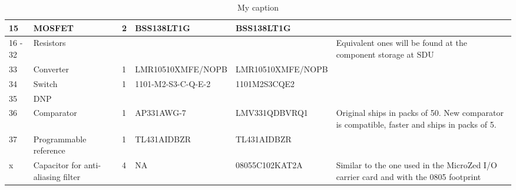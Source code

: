 \begin{table}
\centering
\caption{My caption}
\label{my-label}
\begin{tabular}{|p{0.5cm}|p{2cm}|p{1.5cm}|l|l|p{5cm}|}
\hline

15      & MOSFET                 & 2        & BSS138LT1G            & BSS138LT1G            &                                                                                                                                                                                                              \\ \hline
16 - 32 & Resistors              &          &                       &                       & Equivalent ones will be found at the component storage at SDU                                                                                                                                                \\ \hline
33      & Converter              & 1        & LMR10510XMFE/NOPB     & LMR10510XMFE/NOPB     &                                                                                                                                                                                                              \\ \hline
34      & Switch                 & 1        & 1101-M2-S3-C-Q-E-2    &  1101M2S3CQE2         &                                                                                                   \\ \hline
35      & DNP                    &          &                       &                       &                                                                                                                                                                                                              \\ \hline
36      & Comparator             & 1        & AP331AWG-7            & LMV331QDBVRQ1         & Original ships in packs of 50. New comparator is compatible, faster and ships in packs of 5.                                                                                                                 \\ \hline
37      & Programmable reference & 1        & TL431AIDBZR           & TL431AIDBZR           &                                                                                                                                                                                                              \\ \hline
x      & Capacitor for anti-aliasing filter  & 4        & NA           & 08055C102KAT2A           &  Similar to the one used in the MicroZed I/O carrier card and with the 0805 footprint                                                                                                                                                                                                      \\ \hline

\end{tabular}
\end{table}
